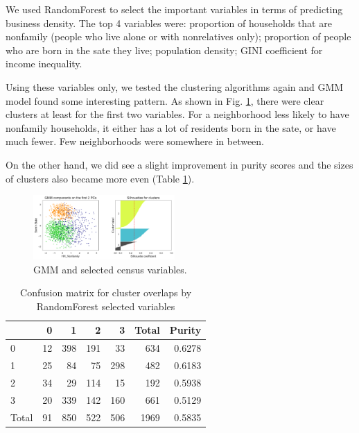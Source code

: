 \documentclass[compsoc]{IEEEtran}
\let\MYoriglatexcaption\caption
\renewcommand{\caption}[2][\relax]{\MYoriglatexcaption[#2]{#2}}
\begin{document}
We used RandomForest to select the important variables in terms of predicting business density. The top 4 variables were: proportion of households that are nonfamily (people who live alone or with nonrelatives only); proportion of people who are born in the sate they live; population density; GINI coefficient for income inequality.

Using these variables only, we tested the clustering algorithms again and GMM model found some interesting pattern. As shown in Fig. \ref{aci-rf-gmm}, there were clear clusters at least for the first two variables. For a neighborhood less likely to have nonfamily households, it either has a lot of residents born in the sate, or have much fewer. Few neighborhoods were somewhere in between.

On the other hand, we did see a slight improvement in purity scores and the sizes of clusters also became more even (Table \ref{confusion-2}).


\begin{figure}[ht]
  \centering
  \hspace{-.5em}
    \includegraphics[width=0.48\textwidth]{aci-rf-gmm}
  \caption{GMM and selected census variables.}
  \label{aci-rf-gmm}
\end{figure}

\begin{table}[ht]
\centering
\caption{Confusion matrix for cluster overlaps by RandomForest selected variables}
\label{confusion-2}

\bgroup
\def\arraystretch{1.5}
\begin{tabular}{lrrrr|r|r}
\toprule
{} &   0 &    1 &    2 &    3 &  Total &  Purity \\
\hline
0     &  12 &  398 &  191 &   33 &    634 &  0.6278 \\
1     &  25 &   84 &   75 &  298 &    482 &  0.6183 \\
2     &  34 &   29 &  114 &   15 &    192 &  0.5938 \\
3     &  20 &  339 &  142 &  160 &    661 &  0.5129 \\
\hline
Total &  91 &  850 &  522 &  506 &   1969 &  0.5835 \\
\bottomrule
\end{tabular}
\egroup

\end{table}
\end{document}
